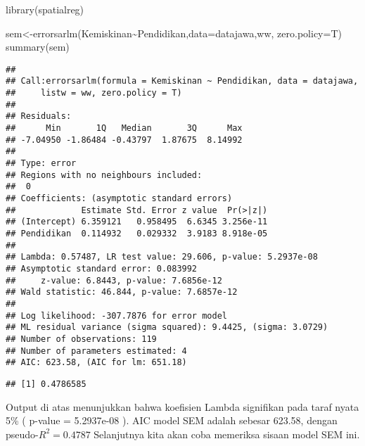 \documentclass[
]{book}
\newenvironment{Shaded}{\begin{snugshade}}{\end{snugshade}}
\newcommand{\AttributeTok}[1]{\textcolor[rgb]{0.77,0.63,0.00}{#1}}
\newcommand{\DecValTok}[1]{\textcolor[rgb]{0.00,0.00,0.81}{#1}}
\newcommand{\FunctionTok}[1]{\textcolor[rgb]{0.00,0.00,0.00}{#1}}
\newcommand{\NormalTok}[1]{#1}
\newcommand{\OtherTok}[1]{\textcolor[rgb]{0.56,0.35,0.01}{#1}}
\newcommand{\SpecialCharTok}[1]{\textcolor[rgb]{0.00,0.00,0.00}{#1}}
\begin{document}
\begin{Shaded}
\begin{Highlighting}[]
\FunctionTok{library}\NormalTok{(spatialreg)}

\NormalTok{sem}\OtherTok{\textless{}{-}}\FunctionTok{errorsarlm}\NormalTok{(Kemiskinan}\SpecialCharTok{\textasciitilde{}}\NormalTok{Pendidikan,}\AttributeTok{data=}\NormalTok{datajawa,ww, }\AttributeTok{zero.policy=}\NormalTok{T)}
\FunctionTok{summary}\NormalTok{(sem)}
\end{Highlighting}
\end{Shaded}

\begin{verbatim}
## 
## Call:errorsarlm(formula = Kemiskinan ~ Pendidikan, data = datajawa, 
##     listw = ww, zero.policy = T)
## 
## Residuals:
##      Min       1Q   Median       3Q      Max 
## -7.04950 -1.86484 -0.43797  1.87675  8.14992 
## 
## Type: error 
## Regions with no neighbours included:
##  0 
## Coefficients: (asymptotic standard errors) 
##             Estimate Std. Error z value  Pr(>|z|)
## (Intercept) 6.359121   0.958495  6.6345 3.256e-11
## Pendidikan  0.114932   0.029332  3.9183 8.918e-05
## 
## Lambda: 0.57487, LR test value: 29.606, p-value: 5.2937e-08
## Asymptotic standard error: 0.083992
##     z-value: 6.8443, p-value: 7.6856e-12
## Wald statistic: 46.844, p-value: 7.6857e-12
## 
## Log likelihood: -307.7876 for error model
## ML residual variance (sigma squared): 9.4425, (sigma: 3.0729)
## Number of observations: 119 
## Number of parameters estimated: 4 
## AIC: 623.58, (AIC for lm: 651.18)
\end{verbatim}

\begin{Shaded}
\end{Shaded}

\begin{verbatim}
## [1] 0.4786585
\end{verbatim}

Output di atas menunjukkan bahwa koefisien Lambda signifikan pada taraf nyata 5\% ( p-value = 5.2937e-08 ). AIC model SEM adalah sebesar 623.58, dengan pseudo-\(R^2=0.4787\) Selanjutnya kita akan coba memeriksa sisaan model SEM ini.
\end{document}
